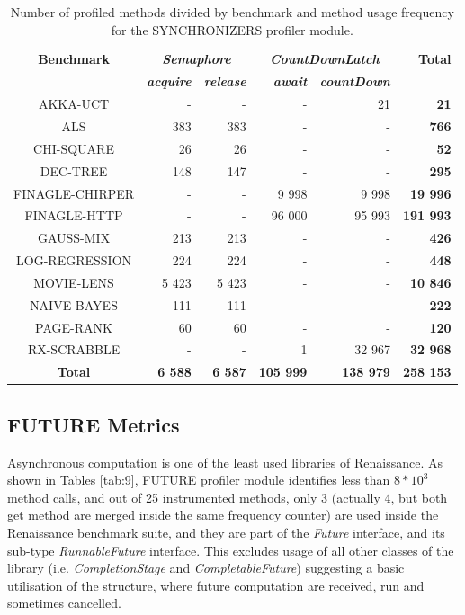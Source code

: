 \documentclass[]{usiinfthesis}
\begin{document}
\begin{table}[h]
\centering
\caption[Method Usage Frequencies for SYNCHRONIZERS]{Number of profiled methods divided by benchmark and method usage frequency for the SYNCHRONIZERS profiler module.}
\label{tab:8}
\begin{tabular}{|c|r|r|r|r|r|}
\hline
  \textbf{ 	Benchmark	 }&\multicolumn{2}{c|}{\textbf{\textit{Semaphore}}} & \multicolumn{2}{c|}{\textbf{\textit{CountDownLatch}}} & \textbf{ 	 Total 	 } \\ 
&\textbf{\textit{ 	acquire	 }}&\textbf{\textit{ 	release	 }}&\textbf{\textit{ 	await	 }}&\textbf{\textit{ 	countDown	 }}& 	\\	\hline
	AKKA-UCT	&	 -   	 & 	 -   	 & 	 -   	 & 	 21 	 &\textbf{ 	 21 	}\\
	ALS	&	 383 	 & 	 383 	 & 	 -   	 & 	 -   	 &\textbf{ 	 766 	}\\
	CHI-SQUARE	&	 26 	 & 	 26 	 & 	 -   	 & 	 -   	 &\textbf{ 	 52 	}\\
	DEC-TREE	&	 148 	 & 	 147 	 & 	 -   	 & 	 -   	 &\textbf{ 	 295 	}\\
	FINAGLE-CHIRPER	&	 -   	 & 	 -   	 & 	 9 998 	 & 	 9 998 	 &\textbf{ 	 19 996 	}\\
	FINAGLE-HTTP	&	 -   	 & 	 -   	 & 	 96 000 	 & 	 95 993 	 &\textbf{ 	 191 993 	}\\
	GAUSS-MIX	&	 213 	 & 	 213 	 & 	 -   	 & 	 -   	 &\textbf{ 	 426 	}\\
	LOG-REGRESSION	&	 224 	 & 	 224 	 & 	 -   	 & 	 -   	 &\textbf{ 	 448 	}\\
	MOVIE-LENS	&	 5 423 	 & 	 5 423 	 & 	 -   	 & 	 -   	 &\textbf{ 	 10 846 	}\\
	NAIVE-BAYES	&	 111 	 & 	 111 	 & 	 -   	 & 	 -   	 &\textbf{ 	 222 	}\\
	PAGE-RANK	&	 60 	 & 	 60 	 & 	 -   	 & 	 -   	 &\textbf{ 	 120 	}\\
	RX-SCRABBLE	&	 -   	 & 	 -   	 & 	 1 	 & 	 32 967 	 &\textbf{ 	 32 968 	}\\ \hline
 \textbf{ 	Total	 }&\textbf{ 	 6 588 	 }&\textbf{ 	 6 587 	 }&\textbf{ 	 105 999 	 }&\textbf{ 	 138 979 	 }&\textbf{ 	 258 153 	}\\

\hline			
\end{tabular}
\end{table}%

 \subsection{FUTURE Metrics}
Asynchronous computation is one of the least used libraries of Renaissance. As shown in Tables \ref{tab:9}, FUTURE profiler module identifies less than \(8*10^3\) method calls, and out of 25 instrumented methods, only 3 (actually 4, but both get method are merged inside the same frequency counter) are used inside the Renaissance benchmark suite, and they are part of the \textit{Future} interface, and its sub-type \textit{RunnableFuture} interface.  This excludes usage of all other classes of the library (i.e. \textit{CompletionStage} and \textit{CompletableFuture}) suggesting a basic utilisation of the structure, where future computation are received, run and sometimes cancelled.
 
\end{document}
